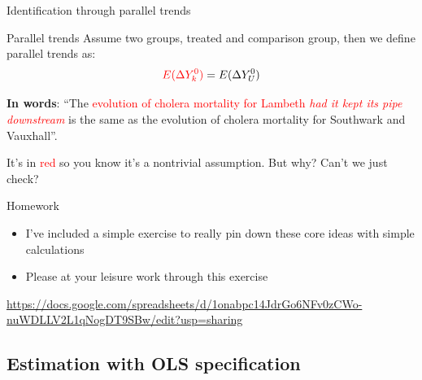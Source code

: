 \documentclass{beamer}
\begin{document}
\begin{frame}{Identification through parallel trends}
	

	\begin{block}{Parallel trends}
	Assume two groups, treated and comparison group, then we define parallel trends as:	 $$\textcolor{red}{E(}\textcolor{red}{\Delta Y^0_k)} = E(\Delta Y^0_U)$$
	\end{block}

\textbf{In words}: ``The \textcolor{red}{evolution of cholera mortality for Lambeth \emph{had it kept its pipe downstream}} is the same as the evolution of cholera mortality for Southwark and Vauxhall''.  

\bigskip

It's in \textcolor{red}{red} so you know it's a nontrivial assumption.  But why?  Can't we just check?

	

	
\end{frame}


\begin{frame}{Homework}

\begin{itemize}
\item I've included a simple exercise to really pin down these core ideas with simple calculations
\item Please at your leisure work through this exercise
\end{itemize}

\bigskip 

\url{https://docs.google.com/spreadsheets/d/1onabpc14JdrGo6NFv0zCWo-nuWDLLV2L1qNogDT9SBw/edit?usp=sharing}

\end{frame}



\subsection{Estimation with OLS specification}
\end{document}
